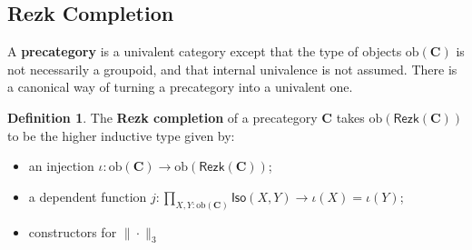 \documentclass{amsart}
\theoremstyle{definition}
\newtheorem{defn}{Definition}[section]
\newcommand{\Rezk}{\ensuremath{\mathsf{Rezk}}}
\newcommand{\Iso}{\ensuremath{\mathsf{Iso}}}
\newcommand{\ob}[1]{\ensuremath{\mathrm{ob}{(\cat{#1})}}}
\newcommand{\cat}[1]{\ensuremath{\mathbf{#1}}}
\renewcommand{\emph}{\textbf}
\begin{document}





\subsection{Rezk Completion}\label{sec:rezk-completion}
A \emph{precategory} is a univalent category except that the type of objects $\ob{C}$ is not necessarily a groupoid, and that internal univalence is not assumed.
There is a canonical way of turning a precategory into a univalent one.
\begin{defn}
    The \emph{Rezk completion} of a precategory $\cat{C}$ takes $\ob{\Rezk(C)}$ to be the higher inductive type given by:
    \begin{itemize}
        \item an injection $\iota : \ob{C} \to \ob{\Rezk(C)}$;
        \item a dependent function $j : \prod_{X, Y : \ob{C}} \Iso(X,Y) \to \iota(X) = \iota(Y)$;
        \item constructors for $\| \cdot \|_3$
    \end{itemize}
\end{defn}
\end{document}
